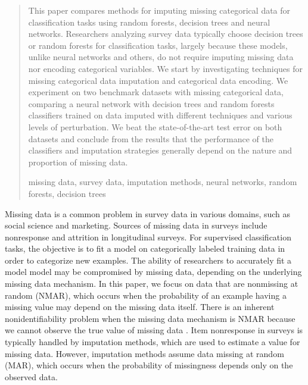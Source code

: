 \documentclass[10pt]{book}
\theoremstyle{definition}
\begin{document}
\begin{quotation}
This paper compares methods for imputing missing categorical data for classification
tasks using random forests, decision trees and neural networks.
Researchers analyzing survey data typically choose decision trees or random
forests for classification tasks, largely because these models, unlike neural
networks and others, do not require imputing missing data nor encoding categorical
variables. We start by investigating techniques for missing categorical data imputation
and categorical data encoding. We experiment on two benchmark datasets with missing categorical data,
comparing a neural network with decision trees and random forests classifiers
trained on data imputed with different techniques and various levels of perturbation. We beat the state-of-the-art test error on both datasets and conclude from the results that the performance of the classifiers and imputation strategies generally depend on the nature and proportion of missing data. \par

\vspace{9pt}
missing data, survey data, imputation methods,  neural networks, random forests, decision trees
\par
\end{quotation}\par



\def\thefigure{\arabic{figure}}
\def\thetable{\arabic{table}}

\fontsize{12}{14pt plus.8pt minus .6pt}\selectfont

\newpage %

\setcounter{chapter}{1}
\setcounter{equation}{0} %

Missing data is a common problem in survey data in various domains, such as social science and marketing. Sources of missing data in surveys include nonresponse and attrition in longitudinal surveys. For supervised classification tasks, the objective is to fit a model on categorically labeled training data in order to categorize new examples. The ability of researchers to accurately fit a model model may be compromised by missing data, depending on the underlying missing data mechanism. In this paper, we focus on data that are nonmissing at random (NMAR), which occurs when the probability of an example having a missing value may depend on the missing data itself. There is an inherent nonidentifiability problem when the missing data mechanism is NMAR because we cannot observe the true value of missing data \citep{tsiatis2007}. Item nonresponse in surveys is typically handled by imputation methods, which are used to estimate a value for missing data. However, imputation methods assume data missing at random (MAR), which occurs when the probability of missingness depends only on the observed data. 
\end{document}
